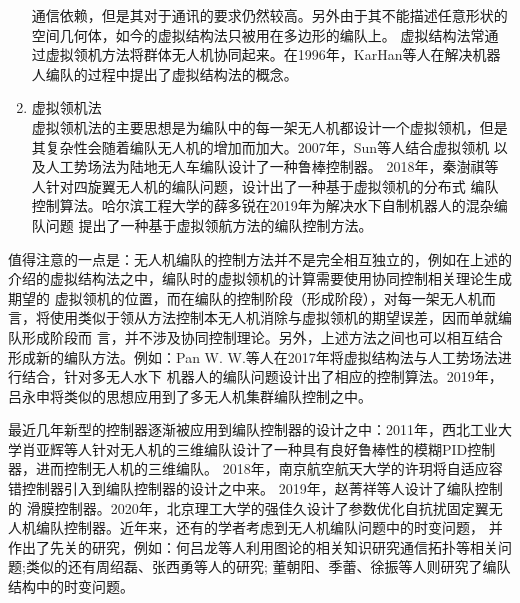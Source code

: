\begin{enumerate}
        通信依赖，但是其对于通讯的要求仍然较高。另外由于其不能描述任意形状的空间几何体，如今的虚拟结构法只被用在多边形的编队上。
        虚拟结构法常通过虚拟领机方法将群体无人机协同起来。在1996年，KarHan等人在解决机器人编队的过程中提出了虚拟结构法的概念。\cite{Tan1996Virtual}
    \item 虚拟领机法\\
        虚拟领机法的主要思想是为编队中的每一架无人机都设计一个虚拟领机，但是其复杂性会随着编队无人机的增加而加大。2007年，Sun等人结合虚拟领机
        以及人工势场法为陆地无人车编队设计了一种鲁棒控制器。\cite{Sun2007}
        2018年，秦澍祺等人针对四旋翼无人机的编队问题，设计出了一种基于虚拟领机的分布式
        编队控制算法。\cite{Qin2018}哈尔滨工程大学的薛多锐在2019年为解决水下自制机器人的混杂编队问题
        提出了一种基于虚拟领航方法的编队控制方法。\cite{Xue2019}
\end{enumerate}
值得注意的一点是：无人机编队的控制方法并不是完全相互独立的，例如在上述的介绍的虚拟结构法之中，编队时的虚拟领机的计算需要使用协同控制相关理论生成期望的
虚拟领机的位置，而在编队的控制阶段（形成阶段），对每一架无人机而言，将使用类似于领从方法控制本无人机消除与虚拟领机的期望误差，因而单就编队形成阶段而
言，并不涉及协同控制理论。另外，上述方法之间也可以相互结合形成新的编队方法。例如：Pan W. W.等人在2017年将虚拟结构法与人工势场法进行结合，针对多无人水下
机器人的编队问题设计出了相应的控制算法。\cite{Pan2017A}2019年，吕永申将类似的思想应用到了多无人机集群编队控制之中。\cite{Lv2019}

最近几年新型的控制器逐渐被应用到编队控制器的设计之中：2011年，西北工业大学肖亚辉等人针对无人机的三维编队设计了一种具有良好鲁棒性的模糊PID控制器，进而控制无人机的三维编队。\cite{XiaoYaHui2011}
2018年，南京航空航天大学的许玥将自适应容错控制器引入到编队控制器的设计之中来。\cite{XuYue} 2019年，赵菁祥等人设计了编队控制的
滑膜控制器。2020年，北京理工大学的强佳久设计了参数优化自抗扰固定翼无人机编队控制器。\cite{MengXiuyun2020}近年来，还有的学者考虑到无人机编队问题中的时变问题，
并作出了先关的研究，例如：何吕龙等人利用图论的相关知识研究通信拓扑等相关问题\cite{Helvlong2020};类似的还有周绍磊\cite{Zhoushaolei2020}、张西勇\cite{Zhangxiyong2019}等人的研究;
董朝阳\cite{Dongzhaoyang2020}、季蕾\cite{Jilei2019}、徐振\cite{Xuzhen2019}等人则研究了编队结构中的时变问题。


